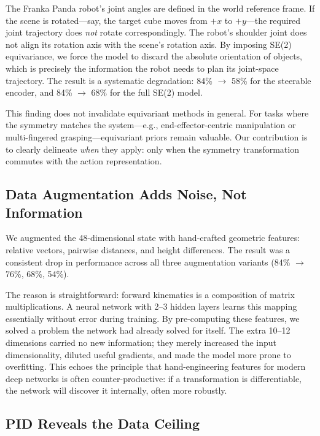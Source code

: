 \documentclass[twocolumn]{article}
\begin{document}
The Franka Panda robot's joint angles are defined in the world reference frame. If the scene is rotated---say, the target cube moves from $+x$ to $+y$---the required joint trajectory does \emph{not} rotate correspondingly. The robot's shoulder joint does not align its rotation axis with the scene's rotation axis. By imposing SE(2) equivariance, we force the model to discard the absolute orientation of objects, which is precisely the information the robot needs to plan its joint-space trajectory. The result is a systematic degradation: 84\% $\rightarrow$ 58\% for the steerable encoder, and 84\% $\rightarrow$ 68\% for the full SE(2) model.

This finding does not invalidate equivariant methods in general. For tasks where the symmetry matches the system---e.g., end-effector-centric manipulation or multi-fingered grasping---equivariant priors remain valuable. Our contribution is to clearly delineate \emph{when} they apply: only when the symmetry transformation commutes with the action representation.

\subsection{Data Augmentation Adds Noise, Not Information}

We augmented the 48-dimensional state with hand-crafted geometric features: relative vectors, pairwise distances, and height differences. The result was a consistent drop in performance across all three augmentation variants (84\% $\rightarrow$ 76\%, 68\%, 54\%).

The reason is straightforward: forward kinematics is a composition of matrix multiplications. A neural network with 2--3 hidden layers learns this mapping essentially without error during training. By pre-computing these features, we solved a problem the network had already solved for itself. The extra 10--12 dimensions carried no new information; they merely increased the input dimensionality, diluted useful gradients, and made the model more prone to overfitting. This echoes the principle that hand-engineering features for modern deep networks is often counter-productive: if a transformation is differentiable, the network will discover it internally, often more robustly.

\subsection{PID Reveals the Data Ceiling}
\end{document}
